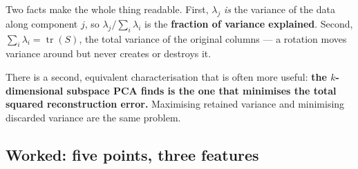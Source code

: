 \documentclass[11pt]{article}
\begin{document}
Two facts make the whole thing readable. First, $\lambda_j$ \emph{is} the
variance of the data along component $j$, so
$\lambda_j / \sum_i \lambda_i$ is the \textbf{fraction of variance
explained}. Second, $\sum_i \lambda_i = \operatorname{tr}(S)$, the total
variance of the original columns --- a rotation moves variance around but
never creates or destroys it.

There is a second, equivalent characterisation that is often more useful:
\textbf{the $k$-dimensional subspace PCA finds is the one that minimises the
total squared reconstruction error.} Maximising retained variance and
minimising discarded variance are the same problem.

\subsection{Worked: five points, three features}
\label{sec:pcahand}
\end{document}
